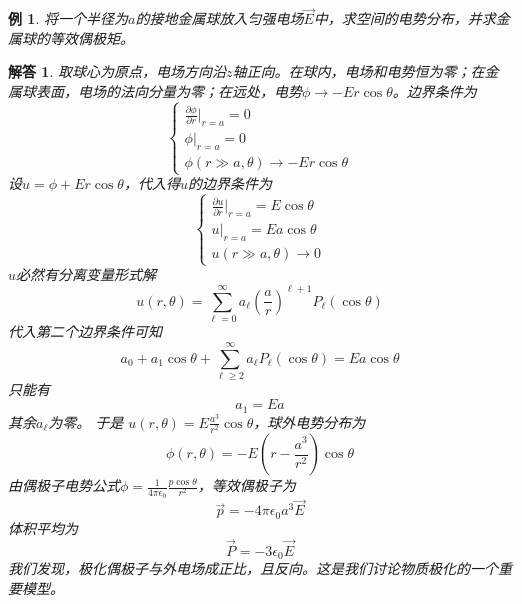 \documentclass[a4paper,11pt]{ctexart}
\newtheorem{eg}{例}[section]
\newtheorem{ans}{解答}[section]
\newcommand{\beq}{\begin{equation}}
\newcommand{\eeq}{\end{equation}}
\newcommand{\epv}{\epsilon_0}
\newcommand{\pfrac}[2]{\frac{\partial #1}{\partial #2}}
\begin{document}
\begin{eg}
将一个半径为$a$的接地金属球放入匀强电场$\vec E$中，求空间的电势分布，并求金属球的等效偶极矩。
\end{eg}
\begin{ans}
取球心为原点，电场方向沿$z$轴正向。在球内，电场和电势恒为零；在金属球表面，电场的法向分量为零；在远处，电势$\phi \to - Er\cos \theta$。边界条件为
\beq
\begin{cases}
\pfrac{\phi}{r}\big|_{r=a} = 0 \\
\phi \big|_{r=a} = 0 \\
\phi(r\gg a,\theta) \to - Er\cos \theta
\end{cases}
\eeq
设$u = \phi + Er\cos \theta$，代入得$u$的边界条件为
\beq
\begin{cases}
\pfrac{u}{r}\big|_{r=a} = E \cos \theta \\
u\big|_{r=a} = Ea \cos \theta \\
u(r\gg a,\theta) \to 0
\end{cases}
\eeq
$u$必然有分离变量形式解
\beq
u(r,\theta) = \sum_{\ell = 0}^\infty a_\ell \left(\frac{a}{r}\right)^{\ell+1} P_\ell (\cos \theta)
\eeq
代入第二个边界条件可知
\beq
a_0 + a_1 \cos \theta + \sum_{\ell \geq 2}^\infty a_\ell  P_\ell (\cos \theta) =  Ea \cos \theta
\eeq
只能有
\beq
a_1 = Ea
\eeq
其余$a_\ell$为零。
于是
$u(r,\theta) = E \frac{a^3}{r^2} \cos \theta $，球外电势分布为
\beq
\phi(r,\theta) = -E\left( r - \frac{a^3}{r^2}\right) \cos \theta
\eeq
由偶极子电势公式$\phi = \frac{1}{4\pi \epv} \frac{p\cos \theta}{r^2}$，等效偶极子为
\beq
\vec p = -4\pi \epv a^3 \vec E
\eeq
体积平均为
\beq
\vec P = - 3 \epv \vec E
\eeq
我们发现，极化偶极子与外电场成正比，且反向。这是我们讨论物质极化的一个重要模型。
\end{ans}
\end{document}
